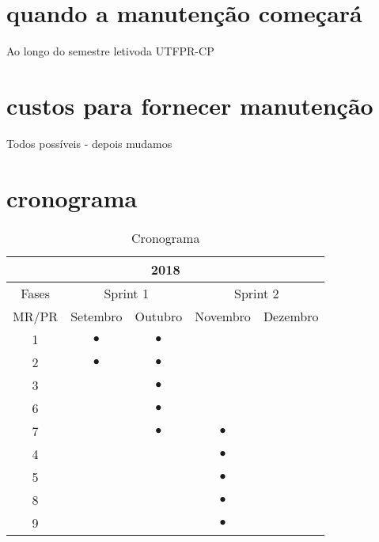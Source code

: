 \section{quando a manutenção começará}
Ao longo do semestre letivoda UTFPR-CP
\section{custos para fornecer manutenção}
Todos possíveis - depois mudamos
\section{cronograma}
\begin{table}[!htb]
  \caption{Cronograma}
  \label{tab:cronograma}
  \begin{center}
	  \begin{tabular}{c||c|c|c|c}
	    \multicolumn{5}{c}{2018} \\ \hline \hline
			\multicolumn{1}{c||}{Fases} &
	    \multicolumn{2}{c|}{Sprint 1} &
	    \multicolumn{2}{|c}{Sprint 2} \\ \hline \hline
	    {MR/PR}  &  Setembro & Outubro  & Novembro & Dezembro  \\ \hline
	    1       & $\bullet$ & $\bullet$&          &           \\
	    2       & $\bullet$ & $\bullet$&          &           \\
	    3       &           & $\bullet$& 				 	&           \\
			6       &           & $\bullet$&          &           \\
			7       &           & $\bullet$& $\bullet$&           \\
	    4       &           &          & $\bullet$&					 \\
	    5       &           &          & $\bullet$& 					 \\
			8       &           &          & $\bullet$&           \\
			9       &           &          & $\bullet$&          	\\
	  \end{tabular}
	  \end{center}
\end{table}
